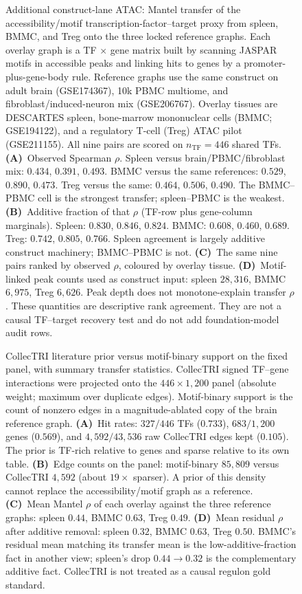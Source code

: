 \documentclass[fleqn,10pt,lineno]{wlpeerj}
\newcommand{\fitfig}[1]{\resizebox{\ifdim\width>\linewidth\linewidth\else\width\fi}{!}{#1}}
\begin{document}
\begin{figure}[!htbp]
\centering
\fitfig{}
\caption{Additional construct-lane ATAC: Mantel transfer of the accessibility/motif transcription-factor--target proxy from spleen, BMMC, and Treg onto the three locked reference graphs.
Each overlay graph is a TF $\times$ gene matrix built by scanning JASPAR motifs in accessible peaks
and linking hits to genes by a promoter-plus-gene-body rule. Reference graphs use the same construct
on adult brain (GSE174367), 10k PBMC multiome, and fibroblast/induced-neuron mix (GSE206767). Overlay
tissues are DESCARTES spleen, bone-marrow mononuclear cells (BMMC; GSE194122), and a regulatory
T-cell (Treg) ATAC pilot (GSE211155). All nine pairs are scored on $n_{\mathrm{TF}}=446$ shared TFs.
\textbf{(A)}~Observed Spearman $\rho$. Spleen versus brain/PBMC/fibroblast mix: $0.434$, $0.391$,
$0.493$. BMMC versus the same references: $0.529$, $0.890$, $0.473$. Treg versus the same: $0.464$,
$0.506$, $0.490$. The BMMC--PBMC cell is the strongest transfer; spleen--PBMC is the weakest.
\textbf{(B)}~Additive fraction of that $\rho$ (TF-row plus gene-column marginals). Spleen: $0.830$,
$0.846$, $0.824$. BMMC: $0.608$, $0.460$, $0.689$. Treg: $0.742$, $0.805$, $0.766$. Spleen agreement
is largely additive construct machinery; BMMC--PBMC is not.
\textbf{(C)}~The same nine pairs ranked by observed $\rho$, coloured by overlay tissue.
\textbf{(D)}~Motif-linked peak counts used as construct input: spleen $28{,}316$, BMMC $6{,}975$,
Treg $6{,}626$. Peak depth does not monotone-explain transfer $\rho$.
These quantities are descriptive rank agreement. They are not a causal TF--target recovery test and
do not add foundation-model audit rows.}
\label{fig:app-mantel}
\end{figure}

\begin{figure}[!htbp]
\centering
\fitfig{}
\caption{CollecTRI literature prior versus motif-binary support on the fixed panel, with summary
transfer statistics.
CollecTRI signed TF--gene interactions were projected onto the
$446\times 1{,}200$ panel (absolute weight; maximum over duplicate edges). Motif-binary support is
the count of nonzero edges in a magnitude-ablated copy of the brain reference graph.
\textbf{(A)}~Hit rates: $327/446$ TFs ($0.733$), $683/1{,}200$ genes ($0.569$), and
$4{,}592/43{,}536$ raw CollecTRI edges kept ($0.105$). The prior is TF-rich relative to genes and
sparse relative to its own table.
\textbf{(B)}~Edge counts on the panel: motif-binary $85{,}809$ versus CollecTRI $4{,}592$ (about
$19\times$ sparser). A prior of this density cannot replace the accessibility/motif graph as a
reference.
\textbf{(C)}~Mean Mantel $\rho$ of each overlay against the three reference graphs: spleen
$0.44$, BMMC $0.63$, Treg $0.49$.
\textbf{(D)}~Mean residual $\rho$ after additive removal: spleen $0.32$, BMMC $0.63$, Treg $0.50$.
BMMC's residual mean matching its transfer mean is the low-additive-fraction fact in another view;
spleen's drop $0.44\rightarrow 0.32$ is the complementary additive fact.
CollecTRI is not treated as a causal regulon gold standard.}
\label{fig:app-collectri}
\end{figure}
\end{document}
